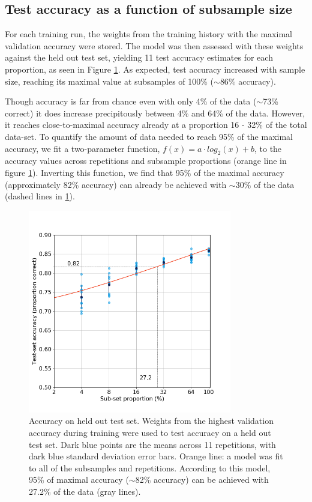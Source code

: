 \subsection{Test accuracy as a function of subsample size}

For each training run, the weights from the training history with the maximal
validation accuracy were stored. The model was then assessed with these weights
against the held out test set, yielding 11 test accuracy estimates for each
proportion, as seen in Figure \ref{fig_test}. As expected, test accuracy
increased with sample size, reaching its maximal value at subsamples of 100\%
($\sim$86\% accuracy).

Though accuracy is far from chance even with only 4\% of the data ($\sim$73\%
correct) it does increase precipitously between 4\% and 64\% of the data.
However, it reaches close-to-maximal accuracy already at a proportion 16 - 32\%
of the total data-set. To quantify the amount of data needed to reach 95\% of
the maximal accuracy, we fit a two-parameter function, $f(x) = a \cdot log_2(x) + b$,
to the accuracy values across repetitions and subsample proportions (orange 
line in figure \ref{fig_test}). Inverting this function, we find that 95\% of 
the maximal accuracy (approximately 82\% accuracy) can already be achieved with 
$\sim30\%$ of the data (dashed lines in \ref{fig_test}).

\begin{figure}[!t]
\centering
\includegraphics[width=3.5in]{./figures/test}

\caption{Accuracy on held out test set. Weights from the highest validation
accuracy during training were used to test accuracy on a held out test set. Dark
blue points are the means across 11 repetitions, with dark blue standard
deviation error bars. Orange line: a model was fit to all of the subsamples and 
repetitions. According to this model, 95\% of maximal accuracy
($\sim$82\% accuracy) can be achieved with 27.2\% of the data (gray lines).}

\label{fig_test}
\end{figure}

